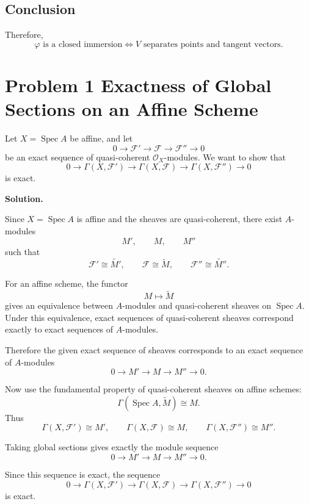\documentclass[12pt,a4paper]{article}
\theoremstyle{notespace}
\begin{document}
\subsection*{Conclusion}

Therefore,
\[
\boxed{
	\varphi \text{ is a closed immersion}
	\iff
	V \text{ separates points and tangent vectors.}
}
\]

\section{Problem 1 Exactness of Global Sections on an Affine Scheme}

Let \(X=\operatorname{Spec}A\) be affine, and let
\[
0\longrightarrow \mathcal F'
\longrightarrow \mathcal F
\longrightarrow \mathcal F''
\longrightarrow 0
\]
be an exact sequence of quasi-coherent \(\mathcal O_X\)-modules. We want to show that
\[
0\longrightarrow \Gamma(X,\mathcal F')
\longrightarrow \Gamma(X,\mathcal F)
\longrightarrow \Gamma(X,\mathcal F'')
\longrightarrow 0
\]
is exact.

\textbf{Solution.}

Since \(X=\operatorname{Spec}A\) is affine and the sheaves are quasi-coherent, there exist \(A\)-modules
\[
M',\qquad M,\qquad M''
\]
such that
\[
\mathcal F' \cong \widetilde{M'},
\qquad
\mathcal F \cong \widetilde M,
\qquad
\mathcal F'' \cong \widetilde{M''}.
\]

For an affine scheme, the functor
\[
M\longmapsto \widetilde M
\]
gives an equivalence between \(A\)-modules and quasi-coherent sheaves on \(\operatorname{Spec}A\). Under this equivalence, exact sequences of quasi-coherent sheaves correspond exactly to exact sequences of \(A\)-modules.

Therefore the given exact sequence of sheaves corresponds to an exact sequence of \(A\)-modules
\[
0\longrightarrow M'
\longrightarrow M
\longrightarrow M''
\longrightarrow 0.
\]

Now use the fundamental property of quasi-coherent sheaves on affine schemes:
\[
\Gamma(\operatorname{Spec}A,\widetilde M)\cong M.
\]
Thus
\[
\Gamma(X,\mathcal F')\cong M',
\qquad
\Gamma(X,\mathcal F)\cong M,
\qquad
\Gamma(X,\mathcal F'')\cong M''.
\]

Taking global sections gives exactly the module sequence
\[
0\longrightarrow M'
\longrightarrow M
\longrightarrow M''
\longrightarrow 0.
\]

Since this sequence is exact, the sequence
\[
0\longrightarrow \Gamma(X,\mathcal F')
\longrightarrow \Gamma(X,\mathcal F)
\longrightarrow \Gamma(X,\mathcal F'')
\longrightarrow 0
\]
is exact.
\end{document}
